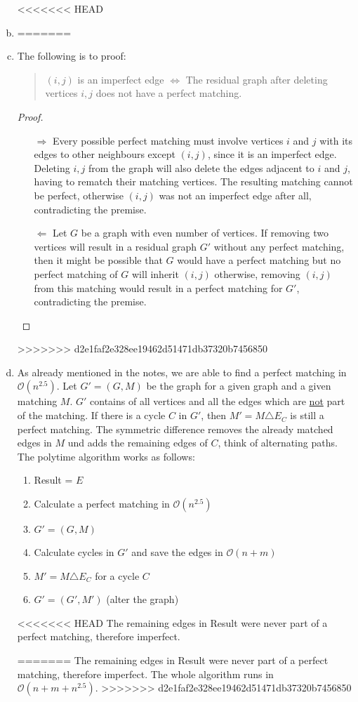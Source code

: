 \documentclass[a4paper,12pt,headsepline]{scrartcl}
\begin{document}
\begin{enumerate}[a)]
<<<<<<< HEAD
	\item
=======
	\item The following is to proof:
	\begin{quotation}
	$(i,j)$ is an imperfect edge $\Leftrightarrow$ The residual graph after deleting vertices $i,j$ does not have a perfect matching.\end{quotation}
	\begin{proof}
	  \begin{itemize}
	      \item[$\Rightarrow$] Every possible perfect matching must involve vertices $i$ and $j$ with its edges to other neighbours except $(i,j)$, since it is an imperfect edge. Deleting $i,j$ from the graph will also delete the edges adjacent to $i$ and $j$, having to rematch their matching vertices. The resulting matching cannot be perfect, otherwise $(i,j)$ was not an imperfect edge after all, contradicting the premise.
	      \item[$\Leftarrow$] Let $G$ be a graph with even number of vertices. If removing two vertices will result in a residual graph $G'$ without any perfect matching, then it might be possible that $G$ would have a perfect matching but no perfect matching of $G$ will inherit $(i,j)$ otherwise, removing $(i,j)$ from this matching would result in a perfect matching for $G'$, contradicting the premise.
	  \end{itemize}
	\end{proof}
	
>>>>>>> d2e1faf2e328ee19462d51471db37320b7456850
	\item As already mentioned in the notes, we are able to find a perfect matching in $\mathcal{O}(n^{2.5})$. Let $G' = (G,M)$ be the graph for a given graph and a given matching $M$. $G'$ contains of all vertices and all the edges which are \underline{not} part of the matching. If there is a cycle $C$ in $G'$, then $M' = M \triangle E_C$ is still a perfect matching. The symmetric difference removes the already matched edges in $M$ und adds the remaining edges of $C$, think of alternating paths. The polytime algorithm works as follows:
	\begin{enumerate}[1.]
		\item Result = $E$
		\item Calculate a perfect matching in $\mathcal{O}(n^{2.5})$
		\item $G' = (G,M)$
		\item Calculate cycles in $G'$ and save the edges in $\mathcal{O}(n+m)$
		\item $M' = M\triangle E_C$ for a cycle $C$
		\item $G' = (G',M')$ (alter the graph)
	\end{enumerate}
<<<<<<< HEAD
	The remaining edges in Result were never part of a perfect matching, therefore imperfect.
	
=======
	The remaining edges in Result were never part of a perfect matching, therefore imperfect. The whole algorithm runs in $\mathcal{O}(n+m+n^{2.5})$. 
>>>>>>> d2e1faf2e328ee19462d51471db37320b7456850
\end{enumerate}
\end{document}
